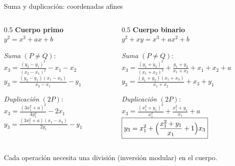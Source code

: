 \documentclass[aspectratio=169,11pt]{beamer}
\begin{document}
\begin{frame}{Suma y duplicación: coordenadas afines}
  \small
  \setlength{\fboxsep}{2pt}
  \setlength{\parskip}{0pt}
  \begin{columns}[t]
    \begin{column}{0.5\textwidth}
      {\color{UGRsoft}\textbf{Cuerpo primo}}\; $y^2=x^3+ax+b$
      \vspace{0.6ex}

      \emph{Suma} $(P\neq Q)$:\\[0.5ex]
      $\boxed{x_3=\frac{(y_2-y_1)^2}{(x_2-x_1)^2}-x_1-x_2}$\\[0.5ex]
      $\boxed{y_3=\frac{(y_2-y_1)(x_1-x_3)}{x_2-x_1}-y_1}$
      \vspace{0.8ex}

      \emph{Duplicación} $(2P)$:\\[0.5ex]
      $\boxed{x_3=\frac{(3x_1^2+a)^2}{4y_1^2}-2x_1}$\\[0.5ex]
      $\boxed{y_3=\frac{(3x_1^2+a)(x_1-x_3)}{2y_1}-y_1}$
    \end{column}
    \begin{column}{0.5\textwidth}
      {\color{UGRsoft}\textbf{Cuerpo binario}}\; $y^2+xy=x^3+ax^2+b$
      \vspace{0.6ex}

      \emph{Suma} $(P\neq Q)$:\\[0.5ex]
      $\boxed{x_3=\frac{(y_1+y_2)^2}{(x_1+x_2)^2}+\frac{y_1+y_2}{x_1+x_2}+x_1+x_2+a}$\\[0.5ex]
      $\boxed{y_3=\frac{(y_1+y_2)(x_1+x_3)}{x_1+x_2}+x_3+y_1}$
      \vspace{0.8ex}

      \emph{Duplicación} $(2P)$:\\[0.5ex]
      $\boxed{x_3=\frac{(x_1^2+y_1)^2}{x_1^2}+\frac{x_1^2+y_1}{x_1}+a}$\\[0.5ex]
      $\boxed{y_3=x_1^2+\Bigl(\frac{x_1^2+y_1}{x_1}+1\Bigr)x_3}$
    \end{column}
  \end{columns}
  \vspace{1ex}
  Cada operación necesita una \alert{división} (inversión modular) en el cuerpo.
\end{frame}
\end{document}
